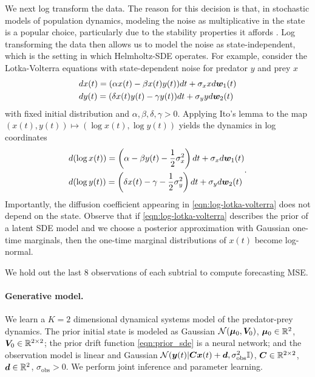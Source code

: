We next log transform the data. The reason for this decision is that, in stochastic models of population dynamics,  modeling the noise as multiplicative in the state is a popular choice, particularly due to the stability properties it affords \cite{mao2002environmental}.
Log transforming the data then allows us to model the noise as state-independent, which is the setting in which Helmholtz-SDE operates.
For example, consider the Lotka-Volterra equations with state-dependent noise for predator $y$ and prey $x$
\begin{equation}\label{eqn:lotka-volterra}
    \begin{aligned}
        &dx(t) = (\alpha x(t) - \beta x(t)y(t))dt + \sigma_x x d \boldsymbol{w}_1(t)\\
        &dy(t) = (\delta x(t)y(t) - \gamma y(t) )dt + \sigma_y y d \boldsymbol{w}_2(t)
    \end{aligned}
\end{equation}
with fixed initial distribution and $\alpha, \beta, \delta, \gamma > 0$. Applying Ito's lemma to the map $(x(t), y(t)) \mapsto (\log x(t), \log  y(t))$ yields the dynamics in log coordinates
\begin{equation}\label{eqn:log-lotka-volterra}
    \begin{aligned}
        &d(\log x(t)) = \left( \alpha - \beta y(t) - \frac{1}{2}\sigma_x^2  \right)dt + \sigma_x d \boldsymbol{w}_1(t)\\
        &d(\log y(t)) = \left( \delta x(t) - \gamma - \frac{1}{2}\sigma_y^2 \right) dt + \sigma_y d \boldsymbol{w}_2(t)
    \end{aligned}.
\end{equation}
Importantly, the diffusion coefficient appearing in \cref{eqn:log-lotka-volterra} does not depend on the state. Observe that if \cref{eqn:log-lotka-volterra} describes the prior of a latent SDE model and we choose a posterior approximation with Gaussian one-time marginals, then the one-time marginal distributions of $x(t)$ become log-normal.

We hold out the last $8$ observations of each subtrial to compute forecasting MSE.

\paragraph{Generative model.}
We learn a $K = 2$ dimensional dynamical systems model of the predator-prey dynamics.
The prior initial state is modeled as Gaussian $\mathcal{N}(\boldsymbol{\mu}_0, \boldsymbol{V}_0)$, $\boldsymbol{\mu}_0 \in \mathbb{R}^2$, $\boldsymbol{V}_0 \in \mathbb{R}^{2 \times 2}$; the prior drift function \cref{eqn:prior_sde} is a neural network; and the observation model is linear and Gaussian $\mathcal{N}(\boldsymbol{y}(t) | \boldsymbol{C} \boldsymbol{x}(t) + \boldsymbol{d}, \sigma_{\mathrm{obs}}^2 \mathbb{I})$, $\boldsymbol{C} \in \mathbb{R}^{2 \times 2}$, $\boldsymbol{d} \in \mathbb{R}^2$, $\sigma_{\mathrm{obs}} > 0$.
We perform joint inference and parameter learning.

